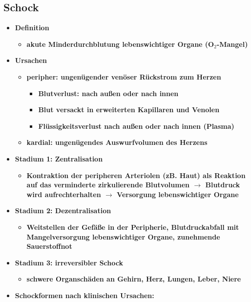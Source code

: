 	\subsection{Schock}
		\begin{itemize}
			\item \textbf{Definition}
				\begin{itemize}
					\item \textbf{akute Minderdurchblutung lebenswichtiger Organe (O$_2$-Mangel)}
				\end{itemize}
			\item \textbf{Ursachen}
				\begin{itemize}
					\item \textbf{peripher: ungenügender venöser Rückstrom zum Herzen}
						\begin{itemize}
							\item \textbf{Blutverlust: nach außen oder nach innen}
							\item \textbf{Blut versackt in erweiterten Kapillaren und Venolen}
							\item \textbf{Flüssigkeitsverlust nach außen oder nach innen (Plasma)}
						\end{itemize}
					\item \textbf{kardial: ungenügendes Auswurfvolumen des Herzens}
				\end{itemize}
			\item \textbf{Stadium 1: Zentralisation}
				\begin{itemize}
					\item \textbf{Kontraktion der peripheren Arteriolen (zB. Haut) als Reaktion auf das verminderte zirkulierende Blutvolumen $\rightarrow$ Blutdruck wird aufrechterhalten $\rightarrow$ Versorgung lebenswichtiger Organe}
				\end{itemize}
			\item \textbf{Stadium 2: Dezentralisation}
				\begin{itemize}
					\item \textbf{Weitstellen der Gefäße in der Peripherie, Blutdruckabfall mit Mangelversorgung lebenswichtiger Organe, zunehmende Sauerstoffnot}
				\end{itemize}
			\item \textbf{Stadium 3: irreversibler Schock}
				\begin{itemize}
					\item \textbf{schwere Organschäden an Gehirn, Herz, Lungen, Leber, Niere}
				\end{itemize}
			\item \textbf{Schockformen nach klinischen Ursachen:}

\end{itemize}
